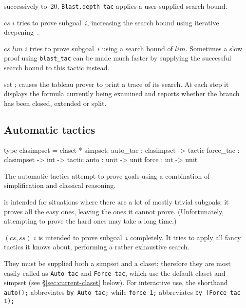 successively to~20, \texttt{Blast.depth_tac} applies a user-supplied search bound.
\begin{ttdescription}
\item[\ttindexbold{blast_tac} $cs$ $i$] tries to prove
  subgoal~$i$, increasing the search bound using iterative
  deepening~\cite{korf85}. 
  
\item[\ttindexbold{Blast.depth_tac} $cs$ $lim$ $i$] tries
  to prove subgoal~$i$ using a search bound of $lim$.  Sometimes a slow
  proof using \texttt{blast_tac} can be made much faster by supplying the
  successful search bound to this tactic instead.
  
\item[set \ttindexbold{Blast.trace};] 
  causes the tableau prover to print a trace of its search.  At each step it
  displays the formula currently being examined and reports whether the branch
  has been closed, extended or split.
\end{ttdescription}


\subsection{Automatic tactics}\label{sec:automatic-tactics}
\begin{ttbox} 
type clasimpset = claset * simpset;
auto_tac        : clasimpset ->        tactic
force_tac       : clasimpset -> int -> tactic
auto            : unit -> unit
force           : int  -> unit
\end{ttbox}
The automatic tactics attempt to prove goals using a combination of
simplification and classical reasoning. 
\begin{ttdescription}
\item[\ttindexbold{auto_tac $(cs,ss)$}] is intended for situations where 
there are a lot of mostly trivial subgoals; it proves all the easy ones, 
leaving the ones it cannot prove.
(Unfortunately, attempting to prove the hard ones may take a long time.)  
\item[\ttindexbold{force_tac} $(cs,ss)$ $i$] is intended to prove subgoal~$i$ 
completely. It tries to apply all fancy tactics it knows about, 
performing a rather exhaustive search.
\end{ttdescription}
They must be supplied both a simpset and a claset; therefore 
they are most easily called as \texttt{Auto_tac} and \texttt{Force_tac}, which 
use the default claset and simpset (see \S\ref{sec:current-claset} below). 
For interactive use, 
the shorthand \texttt{auto();} abbreviates \texttt{by Auto_tac;} 
while \texttt{force 1;} abbreviates \texttt{by (Force_tac 1);}


